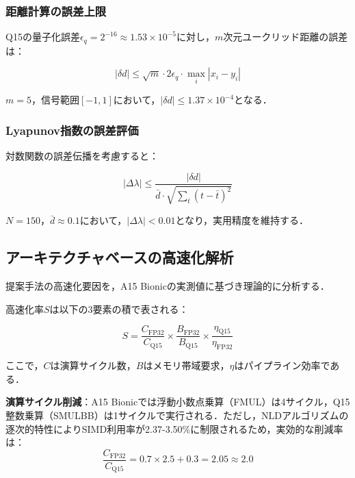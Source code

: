 \documentclass[paper]{ieicej}
\begin{document}
\subsubsection{距離計算の誤差上限}
Q15の量子化誤差$\epsilon_q = 2^{-16} \approx 1.53 \times 10^{-5}$に対し，$m$次元ユークリッド距離の誤差は：

\begin{equation}
|\delta d| \leq \sqrt{m} \cdot 2\epsilon_q \cdot \max_i |x_i - y_i|
\end{equation}

$m=5$，信号範囲$[-1,1]$において，$|\delta d| \leq 1.37 \times 10^{-4}$となる．

\subsubsection{Lyapunov指数の誤差評価}
対数関数の誤差伝播を考慮すると：

\begin{equation}
|\Delta\lambda| \leq \frac{|\delta d|}{\bar{d} \cdot \sqrt{\sum_{t}(t - \bar{t})^2}}
\end{equation}

$N=150$，$\bar{d} \approx 0.1$において，$|\Delta\lambda| < 0.01$となり，実用精度を維持する．

\subsection{アーキテクチャベースの高速化解析}

提案手法の高速化要因を，A15 Bionicの実測値\cite{anandtech2021}に基づき理論的に分析する．

高速化率$S$は以下の3要素の積で表される：

\begin{equation}
S = \frac{C_{\text{FP32}}}{C_{\text{Q15}}} \times \frac{B_{\text{FP32}}}{B_{\text{Q15}}} \times \frac{\eta_{\text{Q15}}}{\eta_{\text{FP32}}}
\end{equation}

ここで，$C$は演算サイクル数，$B$はメモリ帯域要求，$\eta$はパイプライン効率である．

\textbf{演算サイクル削減}：A15 Bionicでは浮動小数点乗算（FMUL）は4サイクル，Q15整数乗算（SMULBB）は1サイクルで実行される\cite{arm2021}．ただし，NLDアルゴリズムの逐次的特性によりSIMD利用率が2.37-3.50\%に制限されるため，実効的な削減率は：
\begin{equation}
\frac{C_{\text{FP32}}}{C_{\text{Q15}}} = 0.7 \times 2.5 + 0.3 = 2.05 \approx 2.0
\end{equation}
\end{document}
